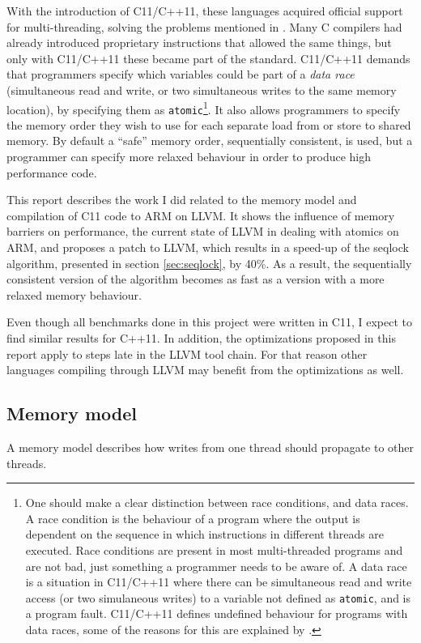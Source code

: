 \documentclass[journal]{IEEEtran}
\begin{document}
With the introduction of C11/C++11, these languages acquired official support for multi-threading, solving the problems mentioned in \cite{boehm2005threads}.
Many C compilers had already introduced proprietary instructions that allowed the same things, but only with C11/C++11 these became part of the standard.
C11/C++11 demands that programmers specify which variables could be part of a \emph{data race} (simultaneous read and write, or two simultaneous writes to the same memory location), by specifying them as \texttt{atomic}\footnote{
    One should make a clear distinction between race conditions, and data races.
    A race condition is the behaviour of a program where the output is dependent on the sequence in which instructions in different threads are executed.
    Race conditions are present in most multi-threaded programs and are not bad, just something a programmer needs to be aware of.
    A data race is a situation in C11/C++11 where there can be simultaneous read and write access (or two simulaneous writes) to a variable not defined as \texttt{atomic}, and is a program fault.
    C11/C++11 defines undefined behaviour for programs with data races, some of the reasons for this are explained by \cite{vyukov2013benign}.
}.
It also allows programmers to specify the memory order they wish to use for each separate load from or store to shared memory.
By default a ``safe'' memory order, sequentially consistent, is used, but a programmer can specify more relaxed behaviour in order to produce high performance code.

This report describes the work I did related to the memory model and compilation of C11 code to ARM on LLVM.
It shows the influence of memory barriers on performance, the current state of LLVM in dealing with atomics on ARM, and proposes a patch to LLVM, which results in a speed-up of the seqlock algorithm, presented in section \ref{sec:seqlock}, by 40\%.
As a result, the sequentially consistent version of the algorithm becomes as fast as a version with a more relaxed memory behaviour.

Even though all benchmarks done in this project were written in C11, I expect to find similar results for C++11.
In addition, the optimizations proposed in this report apply to steps late in the LLVM tool chain.
For that reason other languages compiling through LLVM may benefit from the optimizations as well.

\subsection{Memory model}
A memory model describes how writes from one thread should propagate to other threads.
\end{document}
